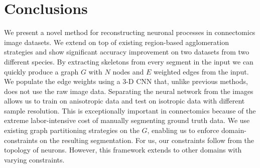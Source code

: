 \section{Conclusions}

We present a novel method for reconstructing neuronal processes in connectomics image datasets.
We extend on top of existing region-based agglomeration strategies and show significant accuracy improvement on two datasets from two different species. 
By extracting skeletons from every segment in the input we can quickly produce a graph $G$ with $N$ nodes and $E$ weighted edges from the input. 
We populate the edge weights using a 3-D CNN that, unlike previous methods, does not use the raw image data.
Separating the neural network from the images allows us to train on anisotropic data and test on isotropic data with different sample resolution. 
This is exceptionally important in connectomics because of the extreme labor-intensive cost of manually segmenting ground truth data. 
We use existing graph partitioning strategies on the $G$, enabling us to enforce domain-constraints on the resulting segmentation.
For us, our constraints follow from the topology of neurons.
However, this framework extends to other domains with varying constraints. 
